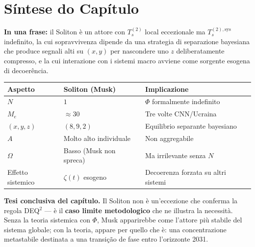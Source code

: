 \section{Síntese do Capítulo}\label{sintesi-del-capítulo}

\Proved{} \textbf{In una frase:} il Soliton è un attore con
\(T_s^{(2)}\) local eccezionale ma \(T_s^{(2),\text{sys}}\) indefinito,
la cui sopravvivenza dipende da una strategia di separazione bayesiana
che produce segnali alti su \((x, y)\) per nascondere uno \(z\)
deliberatamente compresso, e la cui interazione con i sistemi macro
avviene come sorgente esogena di decoerência.

{\def\LTcaptype{none} %
{\small\begin{longtable}[]{@{}
  >{\raggedright\arraybackslash}p{}
  >{\raggedright\arraybackslash}p{}
  >{\raggedright\arraybackslash}p{}@{}}
\toprule\noalign{}
\begin{minipage}[b]{\linewidth}\raggedright
Aspetto
\end{minipage} & \begin{minipage}[b]{\linewidth}\raggedright
Soliton (Musk)
\end{minipage} & \begin{minipage}[b]{\linewidth}\raggedright
Implicazione
\end{minipage} \\
\midrule\noalign{}
\endhead
\bottomrule\noalign{}
\endlastfoot
\(N\) & \(1\) & \(\Phi\) formalmente indefinito \\
\(M_e\) & \(\approx 30\) & Tre volte CNN/Ucraina \\
\((x, y, z)\) & \((8, 9, 2)\) & Equilibrio separante bayesiano \\
\(A\) & Molto alto individuale & Non aggregabile \\
\(\Omega\) & Basso (Musk non spreca) & Ma irrilevante senza \(N\) \\
Effetto sistemico & \(\zeta(t)\) esogeno & Decoerenza forzata su altri
sistemi \\
\end{longtable}}
}

\Hypoth{} \textbf{Tesi conclusiva del capítulo.} Il Soliton non è
un'eccezione che conferma la regola DEQ$^2$ --- è il \textbf{caso limite
metodologico} che ne illustra la necessità. Senza la teoria sistemica
con \(\Phi\), Musk apparirebbe come l'attore più stabile del sistema
globale; con la teoria, appare per quello che è: una concentrazione
metastabile destinata a una transição de fase entro l'orizzonte 2031.



